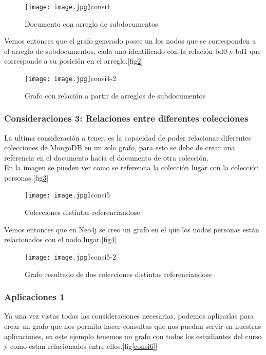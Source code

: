 \documentclass[conference,compsoc]{IEEEtran}
\begin{document}
\begin{figure}[!h]
\centering
\texttt{[image: image.jpg]}{consi4}
\caption{Documento con arreglo de subdocumentos}
\label{consi4}
\end{figure}

Vemos entonces que el grafo generado posee un los nodos que se corresponden a el arreglo de subdocumentos, cada uno identificado con la relación bd0 y bd1 que corresponde a su posición en el arreglo.[fig\ref{consi4-2}] 

\begin{figure}[!h]
\centering
\texttt{[image: image.jpg]}{consi4-2}
\caption{Grafo con relación a partir de arreglos de subdocumentos}
\label{consi4-2}
\end{figure}

\subsubsection{Consideraciones 3: Relaciones entre diferentes colecciones}
La ultima consideración a tener, es la capacidad de poder relacionar diferentes colecciones de MongoDB en un solo grafo, para esto se debe de crear una referencia en el documento hacia el documento de otra colección.
\\ 
En la imagen se pueden ver como se referencia la colección lugar con la colección personas.[fig\ref{consi5}] 

\begin{figure}[!h]
\centering
\texttt{[image: image.jpg]}{consi5}
\caption{Colecciones distintas referenciandose}
\label{consi5}
\end{figure}

Vemos entonces que en Neo4j se creo un grafo en el que los nodos personas están relacionados con el nodo lugar.[fig\ref{consi5-2}]

\begin{figure}[!h]
\centering
\texttt{[image: image.jpg]}{consi5-2}
\caption{Grafo resultado de dos colecciones distintas referenciandose}
\label{consi5-2}
\end{figure}

\subsubsection{Aplicaciones 1}
Ya una vez vistas todas las consideraciones necesarias, podemos aplicarlas para crear un grafo que nos permita hacer consultas que nos puedan servir en nuestras aplicaciones, en este ejemplo tenemos un grafo con todos los estudiantes del curso y como estan relacionados entre ellos.[fig\ref{consi6}]
\end{document}
